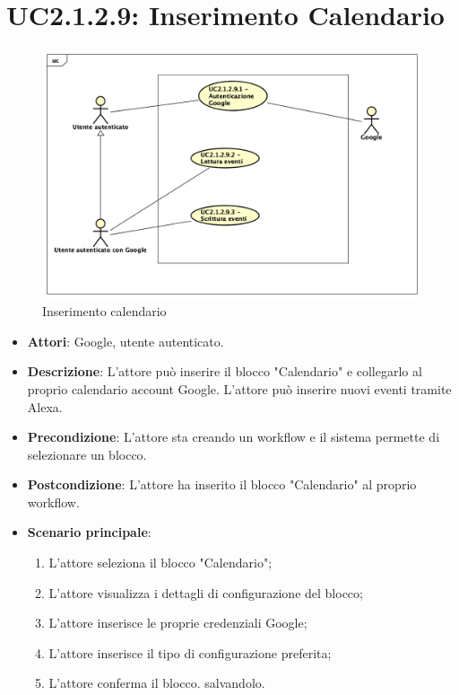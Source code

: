 \section{UC2.1.2.9: Inserimento Calendario}
\label{UC2.1.2.9}
\begin{figure}[h]
	\centering
	\includegraphics[scale=0.4]{Diagram/Calendario.png}
	\caption{Inserimento calendario}\label{}
\end{figure}
\begin{itemize}
	\item \textbf{Attori}: Google, utente autenticato.
	\item \textbf{Descrizione}: L'attore può inserire il blocco "Calendario" e collegarlo al proprio calendario account Google. L'attore può inserire nuovi eventi tramite Alexa.
	\item \textbf{Precondizione}: L'attore sta creando un workflow e il sistema permette di selezionare un blocco.
	\item \textbf{Postcondizione}: L'attore ha inserito il blocco "Calendario" al proprio workflow.
	\item \textbf{Scenario principale}:
	\begin{enumerate} \item L'attore seleziona il blocco "Calendario"; \item L'attore visualizza i dettagli di configurazione del blocco; \item  L'attore inserisce le proprie credenziali Google; \item L'attore inserisce il tipo di configurazione preferita; \item L'attore conferma il blocco. salvandolo.\end{enumerate}
\end{itemize}

